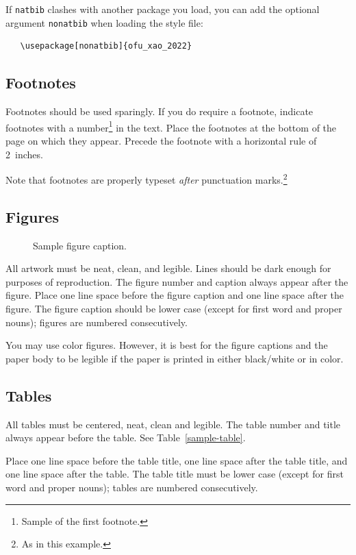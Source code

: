 \documentclass[a4paper]{article}
\begin{document}
If \verb+natbib+ clashes with another package you load, you can add the optional
argument \verb+nonatbib+ when loading the style file:
\begin{verbatim}
   \usepackage[nonatbib]{ofu_xao_2022}
\end{verbatim}


\subsection{Footnotes}


Footnotes should be used sparingly.  If you do require a footnote, indicate
footnotes with a number\footnote{Sample of the first footnote.} in the
text. Place the footnotes at the bottom of the page on which they appear.
Precede the footnote with a horizontal rule of 2~inches.


Note that footnotes are properly typeset \emph{after} punctuation
marks.\footnote{As in this example.}


\subsection{Figures}


\begin{figure}
  \centering
  \fbox{\rule[-.5cm]{0cm}{4cm} \rule[-.5cm]{4cm}{0cm}}
  \caption{Sample figure caption.}
\end{figure}


All artwork must be neat, clean, and legible. Lines should be dark enough for
purposes of reproduction. The figure number and caption always appear after the
figure. Place one line space before the figure caption and one line space after
the figure. The figure caption should be lower case (except for first word and
proper nouns); figures are numbered consecutively.


You may use color figures.  However, it is best for the figure captions and the
paper body to be legible if the paper is printed in either black/white or in
color.


\subsection{Tables}


All tables must be centered, neat, clean and legible.  The table number and
title always appear before the table.  See Table~\ref{sample-table}.


Place one line space before the table title, one line space after the
table title, and one line space after the table. The table title must
be lower case (except for first word and proper nouns); tables are
numbered consecutively.
\end{document}
